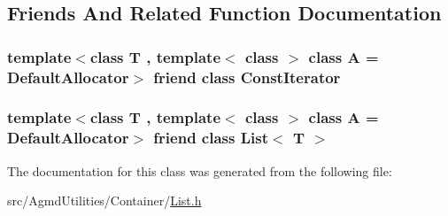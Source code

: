 \subsection{Friends And Related Function Documentation}
\hypertarget{class_agmd_utilities_1_1_list_1_1_iterator_a5485970bb9da6b5d782fa28638b5658f}{
\subsubsection[{Const\+Iterator}]{\setlength{\rightskip}{0pt plus 5cm}template$<$class T , template$<$ class $>$ class A = Default\+Allocator$>$ friend class {\bf Const\+Iterator}\hspace{0.3cm}{\ttfamily [friend]}}}\label{class_agmd_utilities_1_1_list_1_1_iterator_a5485970bb9da6b5d782fa28638b5658f}
\hypertarget{class_agmd_utilities_1_1_list_1_1_iterator_adfa51a0eca1eba953f68ca3f65cdaa05}{
\subsubsection[{List$<$ T $>$}]{\setlength{\rightskip}{0pt plus 5cm}template$<$class T , template$<$ class $>$ class A = Default\+Allocator$>$ friend class {\bf List}$<$ T $>$\hspace{0.3cm}{\ttfamily [friend]}}}\label{class_agmd_utilities_1_1_list_1_1_iterator_adfa51a0eca1eba953f68ca3f65cdaa05}


The documentation for this class was generated from the following file\+:\begin{DoxyCompactItemize}
\item 
src/\+Agmd\+Utilities/\+Container/\hyperlink{_agmd_utilities_2_container_2_list_8h}{List.\+h}\end{DoxyCompactItemize}
